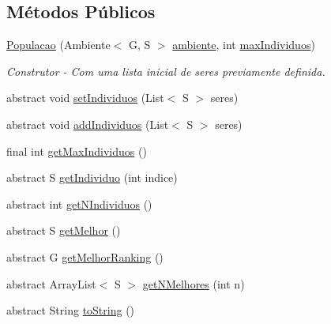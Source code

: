 \subsection*{Métodos Públicos}
\begin{DoxyCompactItemize}
\item 
\hyperlink{classic_1_1populacional_1_1_populacao_3_01_g_01extends_01_number_00_01_s_01extends_01_ser_3_01_g_01_4_01_4_afc32d483258720ae7092dcd9f7fbb28a}{Populacao} (Ambiente$<$ G, S $>$ \hyperlink{classic_1_1populacional_1_1_populacao_3_01_g_01extends_01_number_00_01_s_01extends_01_ser_3_01_g_01_4_01_4_a26077a80e3d7cefbedda10fd28425144}{ambiente}, int \hyperlink{classic_1_1populacional_1_1_populacao_3_01_g_01extends_01_number_00_01_s_01extends_01_ser_3_01_g_01_4_01_4_a45ee056bf518cbc3714bfc29d0efa2b0}{max\-Individuos})
\begin{DoxyCompactList}\small\item\em Construtor -\/ Com uma lista inicial de {\ttfamily seres} previamente definida. \end{DoxyCompactList}\item 
abstract void \hyperlink{classic_1_1populacional_1_1_populacao_3_01_g_01extends_01_number_00_01_s_01extends_01_ser_3_01_g_01_4_01_4_a4d5efce83e1c6829fa7f60b028d597a5}{set\-Individuos} (List$<$ S $>$ seres)
\item 
abstract void \hyperlink{classic_1_1populacional_1_1_populacao_3_01_g_01extends_01_number_00_01_s_01extends_01_ser_3_01_g_01_4_01_4_ae272ab4baa271084ef1a64b1d71ae604}{add\-Individuos} (List$<$ S $>$ seres)
\item 
final int \hyperlink{classic_1_1populacional_1_1_populacao_3_01_g_01extends_01_number_00_01_s_01extends_01_ser_3_01_g_01_4_01_4_a93ff6010d0ec73313c870deb5b1ea4ec}{get\-Max\-Individuos} ()
\item 
abstract S \hyperlink{classic_1_1populacional_1_1_populacao_3_01_g_01extends_01_number_00_01_s_01extends_01_ser_3_01_g_01_4_01_4_a7fbd63dc1acb28c0acba5726c983b600}{get\-Individuo} (int indice)
\item 
abstract int \hyperlink{classic_1_1populacional_1_1_populacao_3_01_g_01extends_01_number_00_01_s_01extends_01_ser_3_01_g_01_4_01_4_a75e9a29298f35ec8ff649f742341134a}{get\-N\-Individuos} ()
\item 
abstract S \hyperlink{classic_1_1populacional_1_1_populacao_3_01_g_01extends_01_number_00_01_s_01extends_01_ser_3_01_g_01_4_01_4_a261b94f3a74c8612f242bcdc394c6bce}{get\-Melhor} ()
\item 
abstract G \hyperlink{classic_1_1populacional_1_1_populacao_3_01_g_01extends_01_number_00_01_s_01extends_01_ser_3_01_g_01_4_01_4_ab0bff67e841d87b7d9fff79ddc01cbf2}{get\-Melhor\-Ranking} ()
\item 
abstract Array\-List$<$ S $>$ \hyperlink{classic_1_1populacional_1_1_populacao_3_01_g_01extends_01_number_00_01_s_01extends_01_ser_3_01_g_01_4_01_4_a86bc847a413d431e21e7eea6c5bbd554}{get\-N\-Melhores} (int n)
\item 
abstract String \hyperlink{classic_1_1populacional_1_1_populacao_3_01_g_01extends_01_number_00_01_s_01extends_01_ser_3_01_g_01_4_01_4_a769b2d7aee594eb145b5c857e58af081}{to\-String} ()
\end{DoxyCompactItemize}
